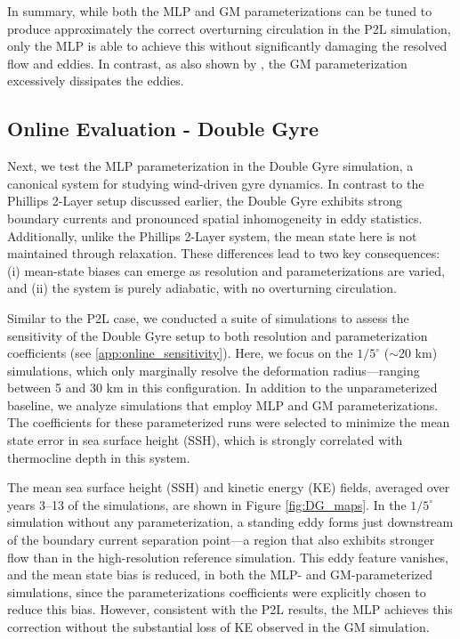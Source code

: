 \documentclass[draft]{agujournal2019}
\begin{document}
In summary, while both the MLP and GM parameterizations can be tuned to produce approximately the correct overturning circulation in the P2L simulation, only the MLP is able to achieve this without significantly damaging the resolved flow and eddies. In contrast, as also shown by \cite{hallberg2013using}, the GM parameterization excessively dissipates the eddies.

\subsection{Online Evaluation - Double Gyre}
Next, we test the MLP parameterization in the Double Gyre simulation, a canonical system for studying wind-driven gyre dynamics. In contrast to the Phillips 2-Layer setup discussed earlier, the Double Gyre exhibits strong boundary currents and pronounced spatial inhomogeneity in eddy statistics. Additionally, unlike the Phillips 2-Layer system, the mean state here is not maintained through relaxation. These differences lead to two key consequences: (i) mean-state biases can emerge as resolution and parameterizations are varied, and (ii) the system is purely adiabatic, with no overturning circulation.

Similar to the P2L case, we conducted a suite of simulations to assess the sensitivity of the Double Gyre setup to both resolution and parameterization coefficients (see \ref{app:online_sensitivity}). Here, we focus on the $1/5^\circ$ ($\sim$20 km) simulations, which only marginally resolve the deformation radius—ranging between 5 and 30 km in this configuration. In addition to the unparameterized baseline, we analyze simulations that employ MLP and GM parameterizations. The coefficients for these parameterized runs were selected to minimize the mean state error in sea surface height (SSH), which is strongly correlated with thermocline depth in this system.

The mean sea surface height (SSH) and kinetic energy (KE) fields, averaged over years 3–13 of the simulations, are shown in Figure \ref{fig:DG_maps}. In the $1/5^\circ$ simulation without any parameterization, a standing eddy forms just downstream of the boundary current separation point—a region that also exhibits stronger flow than in the high-resolution reference simulation. This eddy feature vanishes, and the mean state bias is reduced, in both the MLP- and GM-parameterized simulations, since the parameterizations coefficients were explicitly chosen to reduce this bias. However, consistent with the P2L results, the MLP achieves this correction without the substantial loss of KE observed in the GM simulation.
\end{document}
